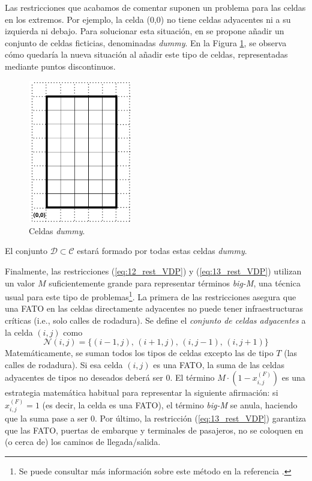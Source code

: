 \documentclass[12pt,a4paper]{book}
\begin{document}
Las restricciones que acabamos de comentar suponen un problema para las celdas en los extremos. Por ejemplo, la celda (0,0) no tiene celdas adyacentes ni a su izquierda ni debajo. Para solucionar esta situación, en \cite{park_vertiport_2022} se propone añadir un conjunto de celdas ficticias, denominadas \textsl{dummy}. En la Figura \ref{fig:cuad_dummy}, se observa cómo quedaría la nueva situación al añadir este tipo de celdas, representadas mediante puntos discontinuos. 

\begin{figure}[h]
    \begin{center}
    \includegraphics[width=0.4\textwidth]{img/dumy_empty.png}
    \end{center}
    \caption{Celdas \textsl{dummy}.}
    \label{fig:cuad_dummy}
\end{figure} 

El conjunto $\mathcal{D} \subset \mathcal{C}$ estará formado por todas estas celdas \textsl{dummy}. 

Finalmente, las restricciones (\ref{eq:12_rest_VDP}) y (\ref{eq:13_rest_VDP}) utilizan un valor $M$ suficientemente grande para representar términos {\sl big-M}, una técnica usual para este tipo de problemas\footnote{Se puede consultar más información sobre este método en la referencia \cite{cococcioni_big-m_2021}.}. La primera de las restricciones asegura que una FATO en las celdas directamente adyacentes no puede tener infraestructuras críticas (i.e., solo calles de rodadura). Se define el \textsl{conjunto de celdas adyacentes} a la celda $(i,j)$ como
\begin{equation}
\mathcal{N}(i,j) = \{ (i-1,j), \,(i+1,j),\, (i,j-1),\, (i,j+1) \}
\end{equation}
Matemáticamente, se suman todos los tipos de celdas excepto las de tipo $T$ (las calles de rodadura). Si esa celda $(i, j)$ es una FATO, la suma de las celdas adyacentes de tipos no deseados deberá ser $0$. El término $M \cdot (1-x_{i,j}^{(F)})$ es una estrategia matemática habitual para representar la siguiente afirmación: si $x_{i,j}^{(F)}=1$ (es decir, la celda es una FATO), el término \textsl{big-M} se anula, haciendo que la suma pase a ser $0$. Por último, la restricción (\ref{eq:13_rest_VDP}) garantiza que las FATO, puertas de embarque y terminales de pasajeros, no se coloquen en (o cerca de) los caminos de llegada/salida. 
\end{document}
